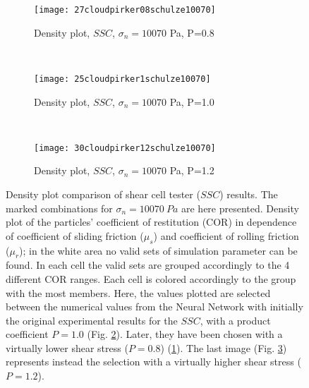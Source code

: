 \documentclass[review]{elsarticle}
\begin{document}
\begin{figure}[htp] \centering

    \begin{subfigure}[b]{0.96\columnwidth}
        \texttt{[image: 27cloudpirker08schulze10070]}
        \caption{Density plot, $SSC$, $\sigma_n=10070$ Pa, P=0.8}
        \label{fig:27cloudpirker08schulze10070} 
    \end{subfigure}\\
    \begin{subfigure}[b]{0.96\columnwidth}
        \texttt{[image: 25cloudpirker1schulze10070]}
        \caption{Density plot, $SSC$, $\sigma_n=10070$ Pa, P=1.0}
        \label{fig:25cloudpirker1schulze10070}
    \end{subfigure}\\

    \begin{subfigure}[b]{0.96\columnwidth}
        \texttt{[image: 30cloudpirker12schulze10070]}
        \caption{Density plot, $SSC$, $\sigma_n=10070$ Pa, P=1.2}
        \label{fig:30cloudpirker12schulze10070} 
    \end{subfigure}
    \caption[Density plot comparison of SSC results]{Density plot comparison of
    shear cell tester ($SSC$) results. The marked combinations for
    $\sigma_n=10070 ~Pa$ are here presented.
    Density plot of the particles' coefficient of restitution (COR) in dependence
	of coefficient of sliding friction ($\mu_s$) and coefficient of rolling
	friction ($\mu_r$); in the white area no valid sets of simulation parameter can be found.
	In each cell the valid sets are grouped accordingly to the 4 different COR
	ranges.
	Each cell is colored accordingly to the group with the most members. 
    Here, the values plotted are selected between the numerical
    values from the Neural Network with initially the original experimental
    results for the $SSC$, with a product coefficient $P=1.0$ (Fig.
    \ref{fig:25cloudpirker1schulze10070}). 
        Later, they have been chosen with  
    a virtually lower shear stress ($P=0.8$)
    (\ref{fig:27cloudpirker08schulze10070}).
    The last image (Fig. \ref{fig:30cloudpirker12schulze10070}) represents
    instead the selection with a virtually higher shear stress ($P=1.2$).    }
    \label{fig:29schulzeradarandcloud}
\end{figure}
\end{document}
